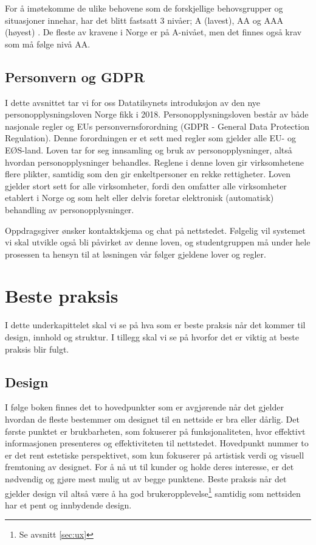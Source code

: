 For å imøtekomme de ulike behovene som de forskjellige behovsgrupper og situasjoner innehar, har det blitt fastsatt 3 nivåer; A (lavest), AA og AAA (høyest) \cite{w3c2008wca}. De fleste av kravene i Norge er på A-nivået, men det finnes også krav som må følge nivå AA.

\subsection{Personvern og GDPR}
I dette avsnittet tar vi for oss Datatilsynets \cite{data2018opm} introduksjon av den nye personopplysningsloven Norge fikk i 2018. Personopplysningsloven består av både nasjonale regler og EUs personvernsforordning (GDPR - General Data Protection Regulation). Denne forordningen er et sett med regler som gjelder alle EU- og EØS-land. Loven tar for seg innsamling og bruk av personopplysninger, altså hvordan personopplysninger behandles. Reglene i denne loven gir virksomhetene flere plikter, samtidig som den gir enkeltpersoner en rekke rettigheter. Loven gjelder stort sett for alle virksomheter, fordi den omfatter alle virksomheter etablert i Norge og som helt eller delvis foretar elektronisk (automatisk) behandling av personopplysninger. 

Oppdragsgiver ønsker kontaktskjema og chat på nettstedet. Følgelig vil systemet vi skal utvikle også bli påvirket av denne loven, og studentgruppen må under hele prosessen ta hensyn til at løsningen vår følger gjeldene lover og regler.

\section{Beste praksis}

I dette underkapittelet skal vi se på hva som er beste praksis når det kommer til design, innhold og struktur. I tillegg skal vi se på hvorfor det er viktig at beste praksis blir fulgt.

\subsection{Design}
\label{sec:design}
I følge boken  \cite[s.~5]{beaird2014tpo} finnes det to hovedpunkter som er avgjørende når det gjelder hvordan de fleste bestemmer om designet til en nettside er bra eller dårlig. Det første punktet er brukbarheten, som fokuserer på funksjonaliteten, hvor effektivt informasjonen presenteres og effektiviteten til nettstedet. Hovedpunkt nummer to er det rent estetiske perspektivet, som kun fokuserer på artistisk verdi og visuell fremtoning av designet. For å nå ut til kunder og holde deres interesse, er det nødvendig og gjøre mest mulig ut av begge punktene. Beste praksis når det gjelder design vil altså være å ha god brukeropplevelse\footnote{Se avsnitt \ref{sec:ux}} samtidig som nettsiden har et pent og innbydende design.

